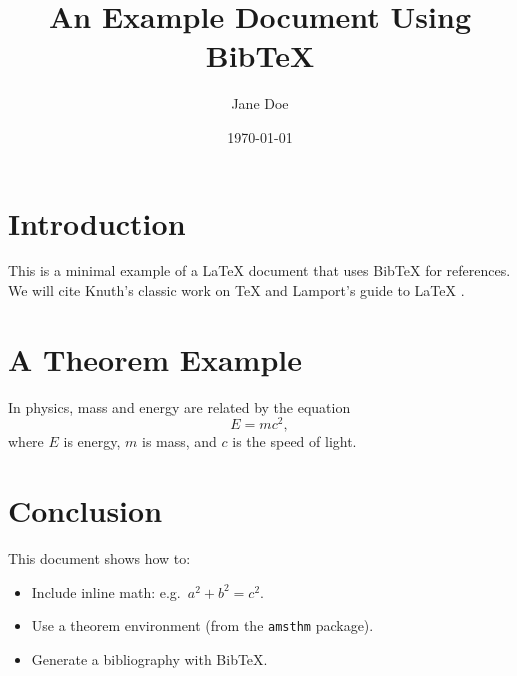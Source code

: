 \documentclass{article}
\begin{document}
\title{An Example Document Using Bib\TeX}
\author{Jane Doe}
\date{\today}
\maketitle

\section{Introduction}

This is a minimal example of a \LaTeX{} document that uses Bib\TeX{} for references.
We will cite Knuth’s classic work on \TeX{} \cite{knuth1984texbook} and Lamport’s guide to \LaTeX{} \cite{lamport1994latex}.

\section{A Theorem Example}

\begin{theorem}
In physics, mass and energy are related by the equation
\[ E = mc^2, \]
where $E$ is energy, $m$ is mass, and $c$ is the speed of light.
\end{theorem}

\section{Conclusion}

This document shows how to:
\begin{itemize}
  \item Include inline math: e.g.\ $a^2 + b^2 = c^2$.
  \item Use a theorem environment (from the {\tt amsthm} package).
  \item Generate a bibliography with Bib\TeX{}.
\end{itemize}



\end{document}
